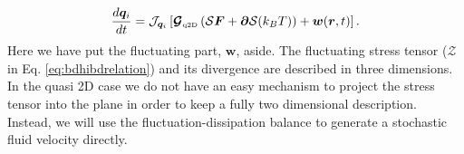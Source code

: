 \documentclass[twoside,openright,titlepage,numbers=noenddot,%
headinclude,footinclude,cleardoublepage=empty,abstract=on,
BCOR=5mm,fontsize=11pt, dvipsnames, paper=b5
]{scrreprt}
\renewcommand{\vec}[1]{\bm{#1}}
\newcommand{\tens}[1]{\bm{\mathcal{#1}}}
\newcommand{\oper}[1]{\mathcal{#1}}
\newcommand{\kT}{k_B T}
\newcommand{\fou}[1]{\widehat{#1}}
\newcommand{\ppos}{q}
\newcommand{\fpos}{r}
\newcommand{\qtd}{\text{\tiny q2D}}
\begin{document}
\begin{equation}
  \label{eq:q2dbdhirel}
  \frac{d\vec{\ppos}_i}{dt} = \oper{J}_{\vec{\ppos}_i}\left[\tens{G}_{\qtd}\left(\oper{S}\vec{F} + \vec{\partial}\oper{S}(\kT)\right) + \vec{w}(\vec{\fpos}, t)\right].
\end{equation}
Here we have put the fluctuating part, $\vec{w}$, aside. The fluctuating stress tensor ($\tens{Z}$ in Eq. \eqref{eq:bdhibdrelation}) and its divergence are described in three dimensions. In the quasi 2D case we do not have an easy mechanism to project the stress tensor into the plane in order to keep a fully two dimensional description. Instead, we will use the fluctuation-dissipation balance to generate a stochastic fluid velocity directly.
%
\end{document}
